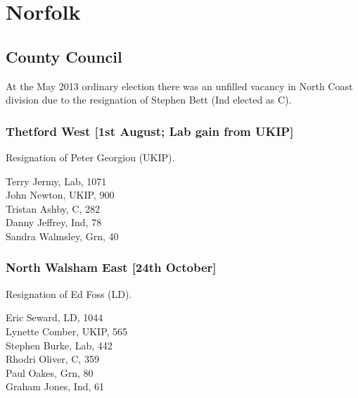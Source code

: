 \documentclass[a4paper,openany,10pt]{book}
\begin{document}
\section{Norfolk}

\subsection*{County Council}

At the May 2013 ordinary election there was an unfilled vacancy in North Coast division due to the resignation of Stephen Bett (Ind elected as C).


\subsubsection*{Thetford West \hspace*{\fill}\nolinebreak[1]%
\enspace\hspace*{\fill}
[1st August; Lab gain from UKIP]}


Resignation of Peter Georgiou (UKIP).



Terry Jermy, Lab, 1071\\
John Newton, UKIP, 900\\
Tristan Ashby, C, 282\\
Danny Jeffrey, Ind, 78\\
Sandra Walmsley, Grn, 40\\


\subsubsection*{North Walsham East \hspace*{\fill}\nolinebreak[1]%
\enspace\hspace*{\fill}
[24th October]}


Resignation of Ed Foss (LD).



Eric Seward, LD, 1044\\
Lynette Comber, UKIP, 565\\
Stephen Burke, Lab, 442\\
Rhodri Oliver, C, 359\\
Paul Oakes, Grn, 80\\
Graham Jones, Ind, 61\\
\end{document}
